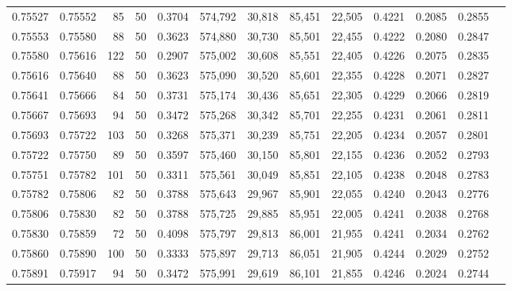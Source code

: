 \begin{tabular}{rrrrrrrrrrrrr}
0.75527 & 0.75552 &    85 &  50 &                                     0.3704 & 574,792 &  30,818 &  85,451 &  22,505 & 0.4221 & 0.2085 & 0.2855 \\
0.75553 & 0.75580 &    88 &  50 &                                     0.3623 & 574,880 &  30,730 &  85,501 &  22,455 & 0.4222 & 0.2080 & 0.2847 \\
0.75580 & 0.75616 &   122 &  50 &                                     0.2907 & 575,002 &  30,608 &  85,551 &  22,405 & 0.4226 & 0.2075 & 0.2835 \\
0.75616 & 0.75640 &    88 &  50 &                                     0.3623 & 575,090 &  30,520 &  85,601 &  22,355 & 0.4228 & 0.2071 & 0.2827 \\
0.75641 & 0.75666 &    84 &  50 &                                     0.3731 & 575,174 &  30,436 &  85,651 &  22,305 & 0.4229 & 0.2066 & 0.2819 \\
0.75667 & 0.75693 &    94 &  50 &                                     0.3472 & 575,268 &  30,342 &  85,701 &  22,255 & 0.4231 & 0.2061 & 0.2811 \\
0.75693 & 0.75722 &   103 &  50 &                                     0.3268 & 575,371 &  30,239 &  85,751 &  22,205 & 0.4234 & 0.2057 & 0.2801 \\
0.75722 & 0.75750 &    89 &  50 &                                     0.3597 & 575,460 &  30,150 &  85,801 &  22,155 & 0.4236 & 0.2052 & 0.2793 \\
0.75751 & 0.75782 &   101 &  50 &                                     0.3311 & 575,561 &  30,049 &  85,851 &  22,105 & 0.4238 & 0.2048 & 0.2783 \\
0.75782 & 0.75806 &    82 &  50 &                                     0.3788 & 575,643 &  29,967 &  85,901 &  22,055 & 0.4240 & 0.2043 & 0.2776 \\
0.75806 & 0.75830 &    82 &  50 &                                     0.3788 & 575,725 &  29,885 &  85,951 &  22,005 & 0.4241 & 0.2038 & 0.2768 \\
0.75830 & 0.75859 &    72 &  50 &                                     0.4098 & 575,797 &  29,813 &  86,001 &  21,955 & 0.4241 & 0.2034 & 0.2762 \\
0.75860 & 0.75890 &   100 &  50 &                                     0.3333 & 575,897 &  29,713 &  86,051 &  21,905 & 0.4244 & 0.2029 & 0.2752 \\
0.75891 & 0.75917 &    94 &  50 &                                     0.3472 & 575,991 &  29,619 &  86,101 &  21,855 & 0.4246 & 0.2024 & 0.2744 \\

\end{tabular}

